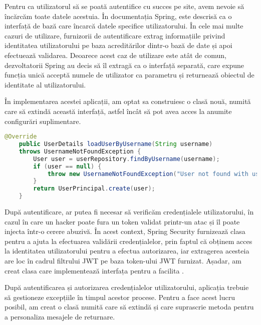 Pentru ca utilizatorul să se poată autentifice cu succes pe site, avem nevoie să încărcăm toate datele acestuia. În documentația Spring,  este descrisă ca o interfață de bază care încarcă datele specifice utilizatorului. În cele mai multe cazuri de utilizare, furnizorii de autentificare extrag informațiile privind identitatea utilizatorului pe baza acreditărilor dintr-o bază de date și apoi efectuează validarea. Deoarece acest caz de utilizare este atât de comun, dezvoltatorii Spring au decis să îl extragă ca o interfață separată, care expune funcția unică  acceptă numele de utilizator ca parametru și returnează obiectul de identitate al utilizatorului.\newline

În implementarea acestei aplicații, am optat sa construiesc o clasă nouă, numită  care să extindă această interfață, astfel încât să pot avea acces la anumite configurări suplimentare.\newline

 \begin{lstlisting}[language=Java]
	@Override
	public UserDetails loadUserByUsername(String username)
	throws UsernameNotFoundException {
		User user = userRepository.findByUsername(username);
		if (user == null) {
			throw new UsernameNotFoundException("User not found with username: " + username);
		}
		return UserPrincipal.create(user);
	}
\end{lstlisting}
\bigskip

După autentificare, ar putea fi necesar să verificăm credențialele utilizatorului, în cazul în care un hacker poate fura un token validat printr-un atac și îl poate injecta într-o cerere abuzivă. În acest context, Spring Security furnizează clasa  pentru a ajuta la efectuarea validării credențialelor, prin faptul că obținem acces la identitatea utilizatorului pentru a efectua autorizarea, iar extragerea acesteia are loc în cadrul filtrului JWT pe baza token-ului JWT furnizat.\newline
Așadar, am creat clasa  care implementează interfața  pentru a facilita .\newline

După autentificarea și autorizarea credențialelor utilizatorului, aplicația trebuie să gestioneze excepțiile în timpul acestor procese. Pentru a face acest lucru posibil, am creat o clasă numită   care să extindă  și care suprascrie metoda  pentru a personaliza mesajele de returnare.\newline

